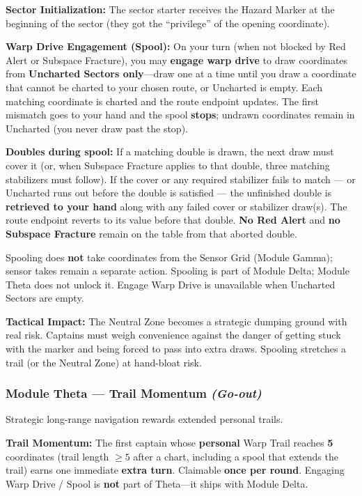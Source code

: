 \documentclass[11pt]{article}
\begin{document}
\textbf{Sector Initialization:} The sector starter receives the Hazard
Marker at the beginning of the sector (they got the ``privilege'' of the
opening coordinate).

\textbf{Warp Drive Engagement (Spool):} On your turn (when not blocked by
Red Alert or Subspace Fracture), you may \textbf{engage warp drive} to
draw coordinates from \textbf{Uncharted Sectors only}---draw one at a
time until you draw a coordinate that cannot be charted to your chosen
route, or Uncharted is empty. Each matching coordinate is charted and
the route endpoint updates. The first mismatch goes to your hand and the
spool \textbf{stops}; undrawn coordinates remain in Uncharted (you never
draw past the stop).

\textbf{Doubles during spool:} If a matching double is drawn, the next
draw must cover it (or, when Subspace Fracture applies to that double,
three matching stabilizers must follow). If the cover or any required
stabilizer fails to match --- or Uncharted runs out before the double is
satisfied --- the unfinished double is \textbf{retrieved to your hand}
along with any failed cover or stabilizer draw(s). The route endpoint
reverts to its value before that double. \textbf{No Red Alert} and
\textbf{no Subspace Fracture} remain on the table from that aborted
double.

Spooling does \textbf{not} take coordinates from the Sensor Grid (Module
Gamma); sensor takes remain a separate action. Spooling is part of Module
Delta; Module Theta does not unlock it. Engage Warp Drive is unavailable
when Uncharted Sectors are empty.

\textbf{Tactical Impact:} The Neutral Zone becomes a strategic dumping
ground with real risk. Captains must weigh convenience against the
danger of getting stuck with the marker and being forced to pass into
extra draws. Spooling stretches a trail (or the Neutral Zone) at
hand-bloat risk.

\subsubsection{Module Theta --- Trail Momentum
\emph{(Go-out)}}\label{module-theta--trail-momentum-go-out}

Strategic long-range navigation rewards extended personal trails.

\textbf{Trail Momentum:} The first captain whose \textbf{personal} Warp
Trail reaches \textbf{5} coordinates (trail length $\geq 5$ after a
chart, including a spool that extends the trail) earns one immediate
\textbf{extra turn}. Claimable \textbf{once per round}. Engaging Warp
Drive / Spool is \textbf{not} part of Theta---it ships with Module
Delta.
\end{document}
